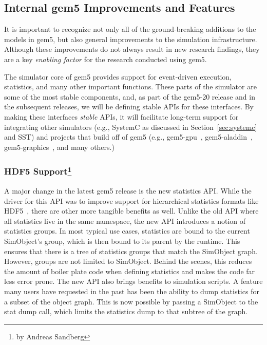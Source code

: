 \subsection{Internal gem5 Improvements and Features}
\label{sec:internal}

It is important to recognize not only all of the ground-breaking additions to the models in gem5, but also general improvements to the simulation infrastructure.
Although these improvements do not always result in new research findings, they are a key \emph{enabling factor} for the research conducted using gem5.

The simulator core of gem5 provides support for event-driven execution, statistics, and many other important functions.
These parts of the simulator are some of the most stable components, and, as part of the gem5-20 release and in the subsequent releases, we will be defining stable APIs for these interfaces.
By making these interfaces \emph{stable} APIs, it will facilitate long-term support for integrating other simulators (e.g., SystemC as discussed in Section~\ref{sec:systemc} and SST) and projects that build off of gem5 (e.g., gem5-gpu~\cite{PowerHOHW15}, gem5-aladdin~\cite{ShaoXSWB16}, gem5-graphics~\cite{GubranAamodt2019-emerald}, and many others.)

\subsubsection[HDF5 Support]{HDF5 Support\footnote{by Andreas Sandberg}}

A major change in the latest gem5 release is the new statistics API.
While the driver for this API was to improve support for hierarchical statistics formats like HDF5~\cite{hdf5}, there are other more tangible benefits as well.
Unlike the old API where all statistics live in the same namespace, the new API introduces a notion of statistics groups.
In most typical use cases, statistics are bound to the current SimObject's group, which is then bound to its parent by the runtime.
This ensures that there is a tree of statistics groups that match the SimObject graph.
However, groups are not limited to SimObject.
Behind the scenes, this reduces the amount of boiler plate code when defining statistics and makes the code far less error prone.
The new API also brings benefits to simulation scripts.
A feature many users have requested in the past has been the ability to dump statistics for a subset of the object graph.
This is now possible by passing a SimObject to the stat dump call, which limits the statistics dump to that subtree of the graph.

